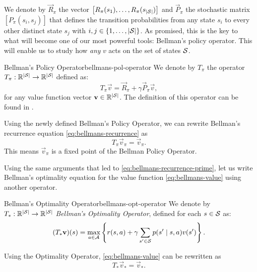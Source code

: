 We denote by $\vec{R}_\pi$ the vector $\left[ R_\pi(s_1), \dots, R_\pi
(s_{|\mathcal{S}|}) \right]$ and $\vec{P}_\pi$ the stochastic matrix $\left[
P_\pi(s_i, s_j) \right]$ that defines the transition probabilities from any
state $s_i$ to every other distinct state $s_j$ with $i, j \in \left\{ 1, \dots,
|\mathcal{S}| \right\}$. As promised, this is the key to what will become one of our
most powerful tools: Bellman's policy operator.  This will enable us to study
how \textit{any} $v$ acts on the set of states $\mathcal{S}$.

\begin{dfn}{Bellman's Policy Operator}{bellmans-pol-operator}
    We denote by $T_\pi$ the operator $T_\pi: \mathbb{R}^{|\mathcal{S}|} \to \mathbb{R}^{|\mathcal{S}|}$
    defined as:
    \[
        T_\pi \vec{v} = \vec{R}_\pi + \gamma \vec{P}_\pi \vec{v},
    \]
    for any value function vector $\mathbf{v} \in \mathbb{R}^{|\mathcal{S}|}$. The definition
    of this operator can be found in \cite[Ch.~5.4]{raoRL4F}.
\end{dfn}

Using the newly defined Bellman's Policy Operator, we can rewrite Bellman's
recurrence equation \eqref{eq:bellmans-recurrence} as
\begin{equation}
    \label{eq:BPO-fixed-point}
    T_\pi \vec{v}_\pi = \vec{v}_\pi.
\end{equation}
This means $\vec{v}_\pi$ is a fixed point of the Bellman Policy Operator.

Using the same arguments that led to \eqref{eq:bellmans-recurrence-prime}, let
us write Bellman's optimality equation for the value function
\eqref{eq:bellmans-value} using another operator.

\begin{dfn}{Bellman's Optimality Operator}{bellmans-opt-operator}
    We denote by $T_*: \mathbb{R}^{|\mathcal{S}|} \to \mathbb{R}^{|\mathcal{S}|}$ \emph{Bellman's Optimality Operator}, defined for each $s \in \mathcal{S}$ as:
    \[
        (T_{*} \mathbf{v})(s) = \max_{a \in \mathcal{A}} \left\{ r(s, a) + \gamma \sum_{s' \in \mathcal{S}} p(s' \mid s, a) v(s') \right\}. 
    \]
\end{dfn}

Using the Optimality Operator, \eqref{eq:bellmans-value} can be rewritten as
\begin{equation}
    \label{eq:bellmans-optimality-operators}
    T_* \vec{v}_{*} = \vec{v}_{*}.
\end{equation}


